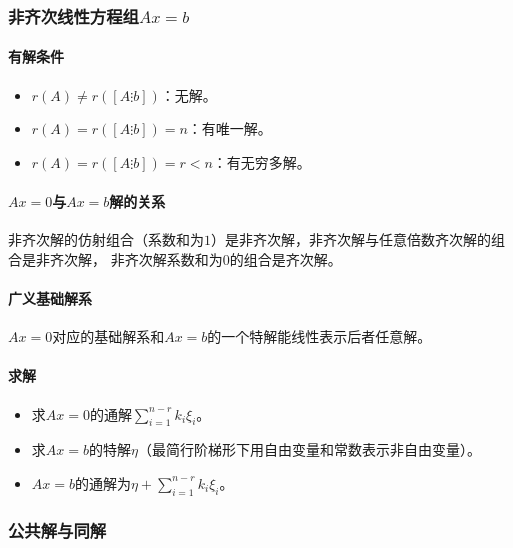 \documentclass[
12pt, %
a4paper, 
oneside, %
headinclude,footinclude, %
]{scrartcl}
\begin{document}
\subsubsection{非齐次线性方程组$ Ax = b $}
\paragraph{有解条件}
\begin{itemize}
\item $ r(A) \neq r([A \vdots b]) $：无解。
\item $ r(A) = r([A \vdots b]) = n $：有唯一解。
\item $ r(A) = r([A \vdots b]) = r < n $：有无穷多解。
\end{itemize}
\paragraph{$ Ax = 0 $与$ Ax = b $解的关系}
非齐次解的仿射组合（系数和为$ 1 $）是非齐次解，非齐次解与任意倍数齐次解的组合是非齐次解，
非齐次解系数和为$ 0 $的组合是齐次解。
\paragraph{广义基础解系}
$ Ax = 0 $对应的基础解系和$ Ax = b $的一个特解能线性表示后者任意解。
\paragraph{求解}
\begin{itemize}
\item 求$ Ax = 0 $的通解$ \sum_{i = 1}^{n - r} k_i \xi_i $。
\item 求$ Ax = b $的特解$ \eta $（最简行阶梯形下用自由变量和常数表示非自由变量）。
\item $ Ax = b $的通解为$ \eta + \sum_{i = 1}^{n - r} k_i \xi_i $。
\end{itemize}
\subsubsection{公共解与同解}
\end{document}
